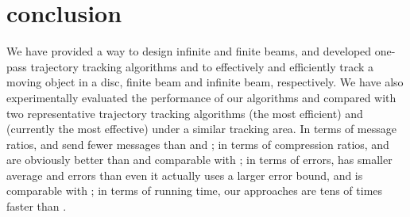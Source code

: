 
\section{conclusion}
\label{sec-conclusion}

We have provided a way to design infinite and finite beams, and developed one-pass trajectory tracking algorithms \citt and \bitt to effectively and efficiently track a moving object in a disc, finite beam and infinite beam, respectively.
We have also experimentally evaluated the performance of our algorithms \citt and \bitt compared with two representative trajectory tracking algorithms \ldrh (the most efficient) and \grts (currently the most effective) under a similar tracking area. 
In terms of message ratios, \citt and \bitt send fewer messages than \grts and \ldrh; in terms of compression ratios, \citt and \bitt are obviously better than \ldrh and comparable with \grts; in terms of errors, \bitt has smaller average \ped and \sed errors than \grts even it actually uses a larger \sed error bound, and \citt is comparable with \grts; in terms of running time, our approaches are tens of times faster than \grts.
